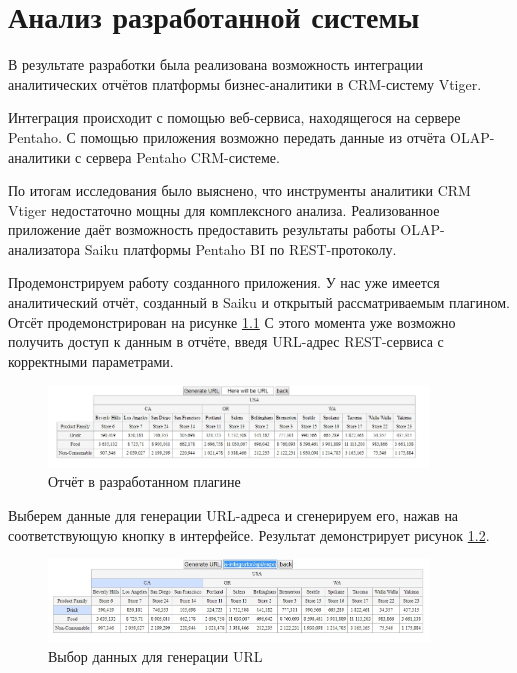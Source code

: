 \chapter{Анализ разработанной системы}

В результате разработки была реализована возможность интеграции  аналитических отчётов платформы бизнес-аналитики в CRM-систему Vtiger.

Интеграция происходит с помощью веб-сервиса, находящегося на сервере Pentaho. С помощью приложения возможно передать данные из отчёта OLAP-аналитики с сервера Pentaho CRM-системе.

По итогам исследования было выяснено, что инструменты аналитики CRM Vtiger недостаточно мощны для комплексного анализа. Реализованное приложение даёт возможность предоставить результаты работы OLAP-анализатора Saiku платформы Pentaho BI по REST-протоколу.

Продемонстрируем работу созданного приложения. У нас уже имеется аналитический отчёт, созданный в Saiku и открытый рассматриваемым плагином. Отсёт продемонстрирован на рисунке \ref{fig:table} С этого момента уже возможно получить доступ к данным в отчёте, введя URL-адрес REST-сервиса с корректными параметрами. 

\begin{figure}[htbp]
	\centering
	\includegraphics[width=0.9\textwidth]{fig/chapter_6/table}
	\caption{Отчёт в разработанном плагине}
	\label{fig:table}
\end{figure}

Выберем данные для генерации URL-адреса и сгенерируем его, нажав на соответствующую кнопку в интерфейсе. Результат демонстрирует рисунок \ref{fig:gen_url1}.

\begin{figure}[htbp]
	\centering
	\includegraphics[width=0.9\textwidth]{fig/chapter_6/gen_url1}
	\caption{Выбор данных для генерации URL}
	\label{fig:gen_url1}
\end{figure}

